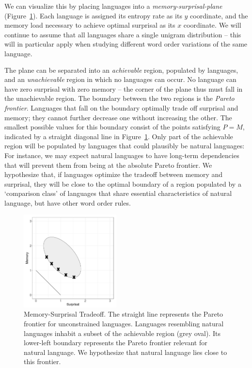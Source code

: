 \documentclass[11pt,letterpaper]{article}
\begin{document}
We can visualize this by placing languages into a \emph{memory-surprisal-plane} (Figure~\ref{fig:toy-mis}). Each language is assigned its entropy rate as its $y$ coordinate, and the memory load necessary to achieve optimal surprisal as its $x$ coordinate.
We will continue to assume that all languages share a single unigram distribution -- this will in particular apply when studying different word order variations of the same language.

The plane can be separated into an \emph{achievable} region, populated by languages, and an \emph{unachievable} region in which no languages can occur.
No language can have zero surprisal with zero memory -- the corner of the plane thus must fall in the unachievable region.
The boundary between the two regions is the \emph{Pareto frontier}.
Languages that fall on the boundary optimally trade off surprisal and memory; they cannot further decrease one without increasing the other.
The smallest possible values for this boundary consist of the points satisfying $P=M$, indicated by a straight diagonal line in Figure~\ref{fig:toy-mis}.
Only part of the achievable region will be populated by languages that could plausibly be natural languages: For instance, we may expect natural languages to have long-term dependencies that will prevent them from being at the absolute Pareto frontier.
We hypothesize that, if languages optimize the tradeoff between memory and surprisal, they will be close to the optimal boundary of a region populated by a `comparison class' of languages that share essential characteristics of natural language, but have other word order rules.


\begin{figure}
\includegraphics[width=0.45\textwidth]{toy/pareto-scheme.pdf}
%
	\caption{Memory-Surprisal Tradeoff. The straight line represents the Pareto frontier for unconstrained languages. Languages resembling natural languages inhabit a subset of the achievable region (grey oval). Its lower-left boundary represents the Pareto frontier relevant for natural language. We hypothesize that natural language lies close to this frontier.   }\label{fig:toy-mis}
\end{figure}
\end{document}

